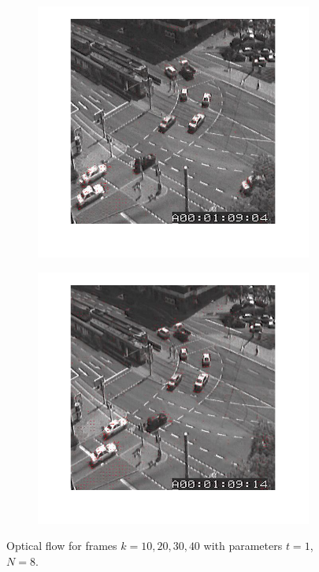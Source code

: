 \documentclass[a4paper]{iacas}
\begin{document}
\begin{figure}[!htbp]
	\begin{subfigure}[b]{0.4\textwidth}
		\includegraphics[width=\textwidth]{404.jpg}
		\caption{}
		\label{fig:404}
	\end{subfigure}
	\begin{subfigure}[b]{0.4\textwidth}
		\includegraphics[width=\textwidth]{405.jpg}
		\caption{}
		\label{fig:405}
	\end{subfigure}
	
	\label{fig:400a}
	\caption{Optical flow for frames $k=10, 20, 30,40$ with parameters $t=1$, $N=8$.}
\end{figure}
\end{document}
